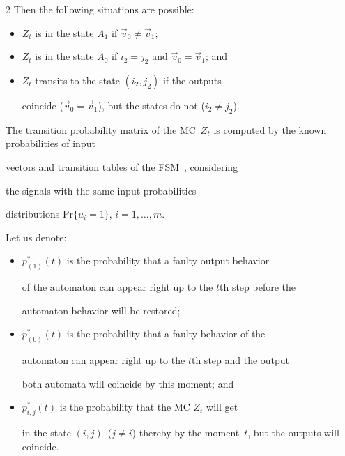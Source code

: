 \begin{multicols}{2}
Then the following situations are possible:

\begin{itemize}

\item $Z_t$ is in the state $A_1$ if $\vec v_0 \ne \vec v_1$;

\item

$Z_t$ is in the state $A_0$ if $i_2=j_2$ and $\vec v_0 =\vec v_1$; and

\item

$Z_t$ transits to the state $(i_2,j_2)$ if the outputs

coincide ($\vec v_0=\vec v_1$), but the states do not ($i_2\ne j_2$).

\end{itemize}



The transition probability matrix of the MC~$Z_t$ is computed by the known probabilities of input

vectors and transition tables of the FSM~\cite{7fr}, considering

the signals with the same input probabilities

distributions $\mathrm{Pr}\{u_i=1\}$, $i=1,\ldots,m$.



Let us denote:

\begin{itemize}

\item $p^*_{(1)}(t)$ is the probability that a faulty output behavior

of the automaton can appear right up to the $t$th step before the

automaton behavior will be restored;

\item

$p^*_{(0)}(t)$ is the probability that a faulty behavior of the

automaton can appear right up to the $t$th step and the output

both automata will coincide by this moment; and

\item

$p^*_{i,j}(t)$ is the probability that the MC $Z_t$ will get

in the state $(i,j)$\  ($j \ne i$) thereby by the moment~$t$, but the outputs will coincide.


\end{itemize}
\end{multicols}
